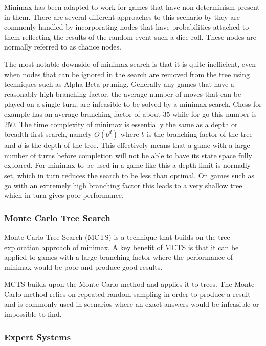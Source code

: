 \documentclass[]{article}
\begin{document}
\par Minimax has been adapted to work for games that have non-determinism present in them. There are several different approaches to this scenario by they are commonly handled by incorporating nodes that have probabilities attached to them reflecting the results of the random event such a dice roll. These nodes are normally referred to as chance nodes.

\par The most notable downside of minimax search is that it is quite inefficient, even when nodes that can be ignored in the search are removed from the tree using techniques such as Alpha-Beta pruning. Generally any games that have a reasonably high branching factor, the average number of moves that can be played on a single turn, are infeasible to be solved by a minimax search. Chess for example has an average branching factor of about 35 while for go this number is 250. The time complexity of minimax is essentially the same as a depth or breadth first search, namely $O(b^d)$ where $b$ is the branching factor of the tree and $d$ is the depth of the tree. This effectively means that a game with a large number of turns before completion will not be able to have its state space fully explored. For minimax to be used in a game like this a depth limit is normally set, which in turn reduces the search to be less than optimal. On games such as go with an extremely high branching factor this leads to a very shallow tree which in turn gives poor performance.

\subsubsection{Monte Carlo Tree Search}
Monte Carlo Tree Search (MCTS) is a technique that builds on the tree exploration approach of minimax. A key benefit of MCTS is that it can be applied to games with a large branching factor where the performance of minimax would be poor and produce good results.

\par MCTS builds upon the Monte Carlo method and applies it to trees. The Monte Carlo method relies on repeated random sampling in order to produce a result and is commonly used in scenarios where an exact answers would be infeasible or impossible to find. 

\subsubsection{Expert Systems}
\end{document}
